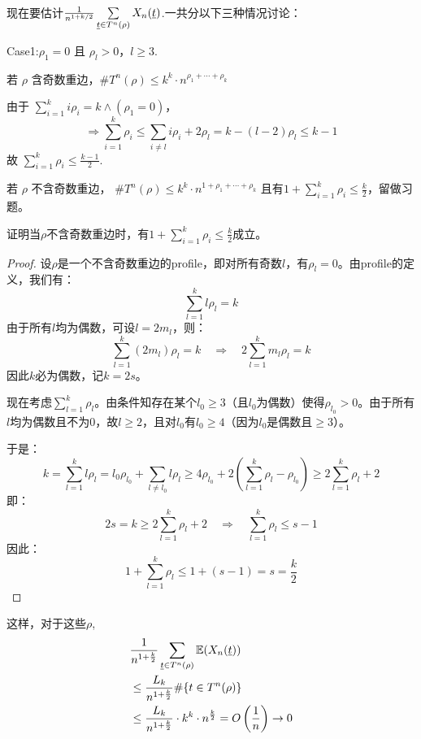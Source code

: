 现在要估计$\frac{1}{n^{1+k/2}}\sum\limits_{\underline{t} \in T^n(\rho)} X_n(\underline{t})$.一共分以下三种情况讨论：

Case1:\( \rho_1 = 0 \) 且 \( \rho_l > 0 \)，\( l \geq 3 \).

若 \( \rho \) 含奇数重边，\( \#T^n(\rho) \leq k^k \cdot n^{\rho_1 + \cdots + \rho_k} \)

由于 \(\sum\limits_{i=1}^k i \rho_i = k \land (\rho_1 = 0)\)，
\begin{equation*}
\Rightarrow \sum_{i=1}^k \rho_i \leq \sum_{i \neq l} i \rho_i + 2 \rho_l = k - (l-2) \rho_l \leq k - 1
\end{equation*}
故 \(\sum\limits_{i=1}^k \rho_i \leq \frac{k-1}{2}\).

若 \( \rho \) 不含奇数重边， \(\# T^n(\rho) \leq k^k \cdot n^{1 + \rho_1 + \cdots + \rho_k} \)
且有\(1 + \sum\limits_{i=1}^{k} \rho_i \leq \frac{k}{2}\)，留做习题。

\begin{9}
    证明当$\rho$不含奇数重边时，有$1 + \sum\limits_{i=1}^{k} \rho_i \leq \frac{k}{2}$成立。
\end{9}

\begin{proof}
    设$\rho$是一个不含奇数重边的profile，即对所有奇数$l$，有$\rho_l = 0$。由profile的定义，我们有：
\[
\sum_{l=1}^k l \rho_l = k
\]
由于所有$l$均为偶数，可设$l = 2m_l$，则：
\[
\sum_{l=1}^k (2m_l) \rho_l = k \quad \Rightarrow \quad 2\sum_{l=1}^k m_l \rho_l = k
\]
因此$k$必为偶数，记$k = 2s$。

现在考虑$\sum\limits_{l=1}^k \rho_l$。由条件知存在某个$l_0 \geq 3$（且$l_0$为偶数）使得$\rho_{l_0} > 0$。由于所有$l$均为偶数且不为$0$，故$l \geq 2$，且对$l_0$有$l_0 \geq 4$（因为$l_0$是偶数且$\geq 3$）。

于是：
\[
k = \sum_{l=1}^k l \rho_l = l_0 \rho_{l_0} + \sum_{l \neq l_0} l \rho_l \geq 4 \rho_{l_0} + 2(\sum_{l=1}^k \rho_l - \rho_{l_0}) \ge 2\sum_{l=1}^k \rho_l + 2
\]
即：
\[
2s = k \geq 2\sum_{l=1}^k \rho_l + 2 \quad \Rightarrow \quad \sum_{l=1}^k \rho_l \leq s - 1
\]
因此：
\[
1 + \sum_{l=1}^k \rho_l \leq 1 + (s - 1) = s = \frac{k}{2}
\]

\end{proof}



这样，对于这些$\rho$,
\begin{equation*}
    \begin{aligned}
       & \frac{1}{n^{1+\frac{k}{2}}} \sum_{\underline{t} \in T^n(\rho)} \mathbb{E}(X_n(\underline{t}))\\
        &\leq \frac{L_k}{n^{1+\frac{k}{2}}} \#\{t \in T^n(\rho)\}\\
        &\leq \frac{L_k}{n^{1+\frac{k}{2}}} \cdot k^k \cdot n^{\frac{k}{2}} = O\left( \frac{1}{n} \right) \to 0
    \end{aligned}
\end{equation*}

